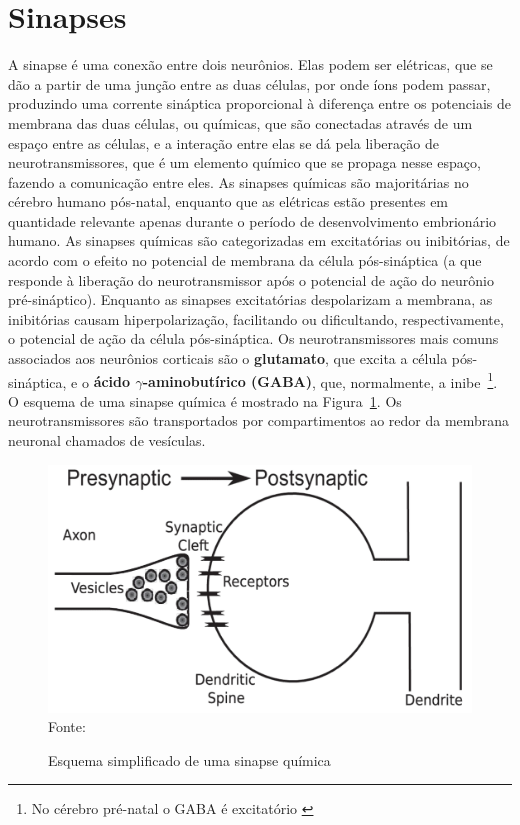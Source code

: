 \section{Sinapses}\label{sec:sinapses}
A sinapse é uma conexão entre dois neurônios. Elas podem ser elétricas, que se dão a partir de uma junção entre as duas células, por onde íons podem passar, produzindo uma corrente sináptica proporcional à diferença entre os potenciais de membrana das duas células, ou químicas, que são conectadas através de um espaço entre as células, e a interação entre elas se dá pela liberação de neurotransmissores, que é um elemento químico que se propaga nesse espaço, fazendo a comunicação entre eles. As sinapses químicas são majoritárias no cérebro humano pós-natal, enquanto que as elétricas estão presentes em quantidade relevante apenas durante o período de desenvolvimento embrionário humano. As sinapses químicas são categorizadas em excitatórias ou inibitórias, de acordo com o efeito no potencial de membrana da célula pós-sináptica (a que responde à liberação do neurotransmissor após o potencial de ação do neurônio pré-sináptico). Enquanto as sinapses excitatórias despolarizam a membrana, as inibitórias causam hiperpolarização, facilitando ou dificultando, respectivamente, o potencial de ação da célula pós-sináptica. Os neurotransmissores mais comuns associados aos neurônios corticais são o \textbf{glutamato}, que excita a célula pós-sináptica, e o \textbf{ácido $\gamma$-aminobutírico (GABA)}, que, normalmente, a inibe~\footnote{No cérebro pré-natal o GABA é excitatório \cite{ben-ari_excitatory_2002}}.
O esquema de uma sinapse química é mostrado na Figura~\ref{fig:sinapses}. Os neurotransmissores são transportados por compartimentos ao redor da membrana neuronal chamados de vesículas.
\begin{figure}[tb]
	\centering
	\caption{Esquema simplificado de uma sinapse química}
	\label{fig:sinapses}
	\includegraphics[width=0.7\linewidth]{figs/sinapses}\\
	\small{Fonte: \cite{miller_introductory_2018}}
\end{figure}

